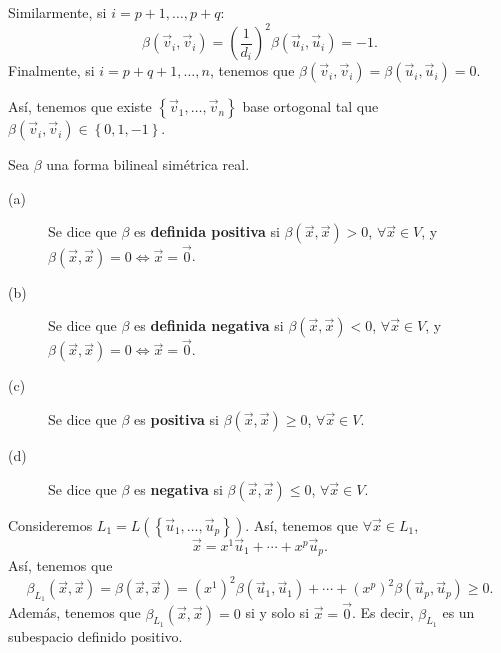 Similarmente, si $\displaystyle i = p + 1, \ldots, p + q $:
\[ \beta\left(\vec{v}_{i}, \vec{v}_{i}\right) = \left(\frac{1}{d _{i}}\right)^{2}\beta\left(\vec{u}_{i}, \vec{u}_{i}\right) = -1 .\]
Finalmente, si $\displaystyle i = p + q + 1, \ldots, n $, tenemos que $\displaystyle \beta\left(\vec{v}_{i}, \vec{v}_{i}\right) = \beta\left(\vec{u}_{i}, \vec{u}_{i}\right) = 0 $.
\begin{observation}
	\normalfont Así, tenemos que existe $\displaystyle \left\{ \vec{v}_{1}, \ldots, \vec{v}_{n}\right\}  $ base ortogonal tal que $\displaystyle \beta\left(\vec{v}_{i}, \vec{v}_{i}\right) \in \left\{ 0, 1, - 1\right\}  $.
\end{observation}
\begin{fdefinition}[]
\normalfont Sea $\displaystyle \beta  $ una forma bilineal simétrica real.
\begin{description}
\item[(a)] Se dice que $\displaystyle \beta  $ es \textbf{definida positiva} si $\displaystyle \beta\left(\vec{x}, \vec{x}\right) > 0 $, $\displaystyle \forall \vec{x} \in V $, y $\displaystyle \beta\left(\vec{x}, \vec{x}\right) = 0 \iff \vec{x} = \vec{0} $.
\item[(b)] Se dice que $\displaystyle \beta  $ es \textbf{definida negativa} si $\displaystyle \beta\left(\vec{x}, \vec{x}\right) < 0 $, $\displaystyle \forall \vec{x} \in V $, y $\displaystyle \beta\left(\vec{x}, \vec{x}\right) = 0 \iff \vec{x} = \vec{0} $.
\item[(c)] Se dice que $\displaystyle \beta  $ es \textbf{positiva} si $\displaystyle \beta\left(\vec{x}, \vec{x}\right) \geq 0 $, $\displaystyle \forall \vec{x} \in V $.
\item[(d)] Se dice que $\displaystyle \beta  $ es \textbf{negativa} si $\displaystyle \beta\left(\vec{x}, \vec{x}\right) \leq 0 $, $\displaystyle \forall \vec{x} \in V $.
\end{description}
\end{fdefinition}
Consideremos $\displaystyle L_{1} = L\left( \left\{ \vec{u}_{1}, \ldots, \vec{u}_{p}\right\} \right) $. Así, tenemos que $\displaystyle \forall \vec{x} \in L_{1} $,
\[ \vec{x} = x^{1}\vec{u}_{1} + \cdots + x^{p}\vec{u}_{p} .\]
Así, tenemos que 
\[ \beta_{L_{1}}\left(\vec{x}, \vec{x}\right) = \beta\left(\vec{x}, \vec{x}\right) = \left(x^{1}\right)^{2}\beta\left(\vec{u}_{1},\vec{u}_{1}\right) + \cdots + \left(x^{p}\right)^{2}\beta\left(\vec{u}_{p}, \vec{u}_{p}\right) \geq 0 .\]
Además, tenemos que $\displaystyle \beta_{L_{1}}\left(\vec{x}, \vec{x}\right) = 0 $ si y solo si $\displaystyle \vec{x} = \vec{0} $. Es decir, $\displaystyle \beta_{L_{1}} $ es un subespacio definido positivo. 
